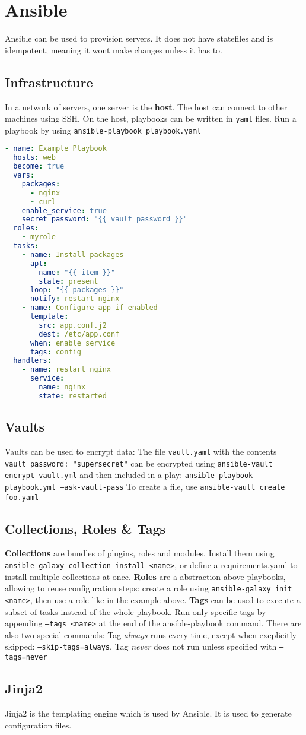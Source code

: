 \section{Ansible}
Ansible can be used to provision servers. It does not have statefiles and is idempotent, meaning it wont make changes unless it has to.
\subsection{Infrastructure}
In a network of servers, one server is the \textbf{host}. The host can connect to other machines using SSH. On the host, playbooks can be written in \texttt{yaml} files. Run a playbook by using \texttt{ansible-playbook playbook.yaml}

\begin{lstlisting}[language=yaml]
- name: Example Playbook
  hosts: web
  become: true
  vars:
    packages:
      - nginx
      - curl
    enable_service: true
    secret_password: "{{ vault_password }}"
  roles:
    - myrole
  tasks:
    - name: Install packages
      apt:
        name: "{{ item }}"
        state: present
      loop: "{{ packages }}"
      notify: restart nginx
    - name: Configure app if enabled
      template:
        src: app.conf.j2
        dest: /etc/app.conf
      when: enable_service
      tags: config
  handlers:
    - name: restart nginx
      service:
        name: nginx
        state: restarted
\end{lstlisting}
\subsection{Vaults}
Vaults can be used to encrypt data: The file \texttt{vault.yaml} with the contents \texttt{vault\_password: "supersecret"} can be encrypted using \texttt{ansible-vault encrypt vault.yml} and then included in a play: \texttt{ansible-playbook playbook.yml --ask-vault-pass}
To create a file, use \texttt{ansible-vault create foo.yaml}
\subsection{Collections, Roles \& Tags}

\textbf{Collections} are bundles of plugins, roles and modules. Install them using \texttt{ansible-galaxy collection install <name>}, or define a requirements.yaml to install multiple collections at once.
\textbf{Roles} are a abstraction above playbooks, allowing to reuse configuration steps: create a role using \texttt{ansible-galaxy init <name>}, then use a role like in the example above.
\textbf{Tags} can be used to execute a subset of tasks instead of the whole playbook. Run only specific tags by appending \texttt{--tags <name>} at the end of the ansible-playbook command. There are also two special commands: Tag \textit{always} runs every time, except when excplicitly skipped: \texttt{--skip-tags=always}. Tag \textit{never} does not run unless specified with \texttt{--tags=never}
\subsection{Jinja2}
Jinja2 is the templating engine which is used by Ansible. It is used to generate configuration files.
